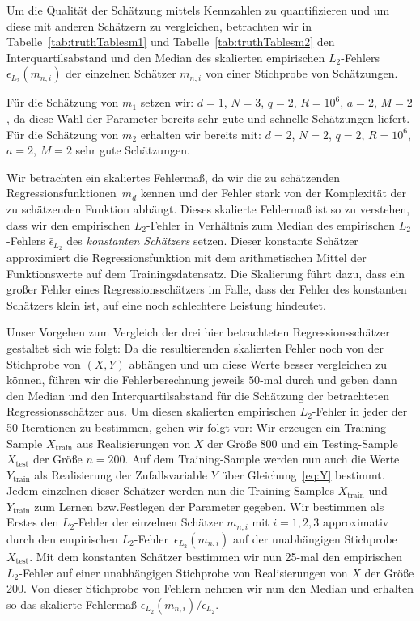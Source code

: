 Um die Qualität der Schätzung mittels Kennzahlen zu quantifizieren und um diese mit anderen Schätzern zu vergleichen, betrachten wir in Tabelle~\ref{tab:truthTablesm1} und Tabelle~\ref{tab:truthTablesm2} den Interquartilsabstand und den Median des skalierten empirischen $L_2$-Fehlers $\epsilon_{L_2}(m_{n,i})$ der einzelnen Schätzer $m_{n,i}$ von einer Stichprobe von Schätzungen. 

Für die Schätzung von $m_1$ setzen wir: $d = 1$, $N = 3$, $q = 2$, $R = 10^6$, $a = 2$, $M = 2$, da diese Wahl der Parameter bereits sehr gute und schnelle Schätzungen liefert. Für die Schätzung von $m_2$ erhalten wir bereits mit: $d = 2$, $N = 2$, $q = 2$, $R = 10^6$, $a = 2$, $M = 2$ sehr gute Schätzungen.

Wir betrachten ein skaliertes Fehlermaß, da wir die zu schätzenden Regressionsfunktionen~$m_d$ kennen und der Fehler stark von der Komplexität der zu schätzenden Funktion abhängt. Dieses skalierte Fehlermaß ist so zu verstehen, dass wir den empirischen $L_2$-Fehler in Verhältnis zum Median des empirischen $L_2$-Fehlers $\bar{\epsilon}_{L_2}$ des \textit{konstanten Schätzers} setzen. Dieser konstante Schätzer approximiert die Regressionsfunktion mit dem arithmetischen Mittel der Funktionswerte auf dem Trainingsdatensatz. Die Skalierung führt dazu, dass ein großer Fehler eines Regressionsschätzers im Falle, dass der Fehler des konstanten Schätzers klein ist, auf eine noch schlechtere Leistung hindeutet.

Unser Vorgehen zum Vergleich der drei hier betrachteten Regressionsschätzer gestaltet sich wie folgt:
Da die resultierenden skalierten Fehler noch von der Stichprobe von $(X, Y)$ abhängen und um diese Werte besser vergleichen zu können, führen wir die Fehlerberechnung jeweils $50$-mal durch und geben dann den Median und den Interquartilsabstand für die Schätzung der betrachteten Regressionsschätzer aus.
Um diesen skalierten empirischen $L_2$-Fehler in jeder der 50 Iterationen zu bestimmen, gehen wir folgt vor:
Wir erzeugen ein Training-Sample $X_{\text{train}}$ aus Realisierungen von $X$ der Größe $800$ und ein Testing-Sample~$X_{\text{test}}$ der Größe $n = 200$.
Auf dem Training-Sample werden nun auch die Werte $Y_{\text{train}}$ als Realisierung der Zufallsvariable $Y$ über Gleichung~\eqref{eq:Y} bestimmt. Jedem einzelnen dieser Schätzer werden nun die Training-Samples $X_{\text{train}}$ und $Y_{\text{train}}$ zum Lernen bzw.\@ Festlegen der Parameter gegeben. Wir bestimmen als Erstes den $L_2$-Fehler der einzelnen Schätzer $m_{n,i}$ mit $i = 1,2,3$ approximativ durch den empirischen $L_2$-Fehler~$\epsilon_{L_2}(m_{n,i})$ auf der unabhängigen Stichprobe $X_{\text{test}}.$ Mit dem konstanten Schätzer bestimmen wir nun 25-mal den empirischen $L_2$-Fehler auf einer unabhängigen Stichprobe von Realisierungen von $X$ der Größe 200.
Von dieser Stichprobe von Fehlern nehmen wir nun den Median und erhalten so das skalierte Fehlermaß $\epsilon_{L_2}(m_{n,i}) / \bar{\epsilon}_{L_2}.$

